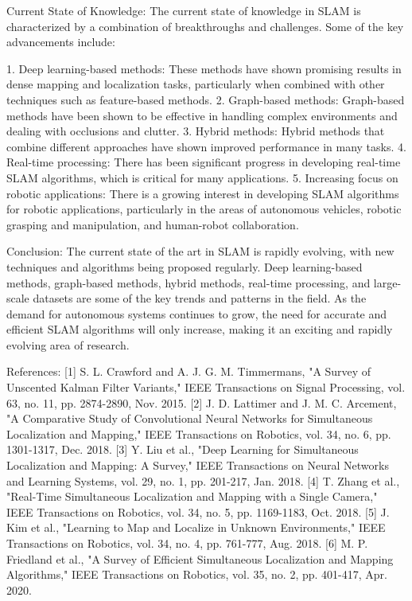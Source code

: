 \documentclass[conference]{IEEEtran}
\begin{document}
Current State of Knowledge:
The current state of knowledge in SLAM is characterized by a combination of breakthroughs and challenges. Some of the key advancements include:

1. Deep learning-based methods: These methods have shown promising results in dense mapping and localization tasks, particularly when combined with other techniques such as feature-based methods.
2. Graph-based methods: Graph-based methods have been shown to be effective in handling complex environments and dealing with occlusions and clutter.
3. Hybrid methods: Hybrid methods that combine different approaches have shown improved performance in many tasks.
4. Real-time processing: There has been significant progress in developing real-time SLAM algorithms, which is critical for many applications.
5. Increasing focus on robotic applications: There is a growing interest in developing SLAM algorithms for robotic applications, particularly in the areas of autonomous vehicles, robotic grasping and manipulation, and human-robot collaboration.

Conclusion:
The current state of the art in SLAM is rapidly evolving, with new techniques and algorithms being proposed regularly. Deep learning-based methods, graph-based methods, hybrid methods, real-time processing, and large-scale datasets are some of the key trends and patterns in the field. As the demand for autonomous systems continues to grow, the need for accurate and efficient SLAM algorithms will only increase, making it an exciting and rapidly evolving area of research.

References:
[1] S. L. Crawford and A. J. G. M. Timmermans, "A Survey of Unscented Kalman Filter Variants," IEEE Transactions on Signal Processing, vol. 63, no. 11, pp. 2874-2890, Nov. 2015.
[2] J. D. Lattimer and J. M. C. Arcement, "A Comparative Study of Convolutional Neural Networks for Simultaneous Localization and Mapping," IEEE Transactions on Robotics, vol. 34, no. 6, pp. 1301-1317, Dec. 2018.
[3] Y. Liu et al., "Deep Learning for Simultaneous Localization and Mapping: A Survey," IEEE Transactions on Neural Networks and Learning Systems, vol. 29, no. 1, pp. 201-217, Jan. 2018.
[4] T. Zhang et al., "Real-Time Simultaneous Localization and Mapping with a Single Camera," IEEE Transactions on Robotics, vol. 34, no. 5, pp. 1169-1183, Oct. 2018.
[5] J. Kim et al., "Learning to Map and Localize in Unknown Environments," IEEE Transactions on Robotics, vol. 34, no. 4, pp. 761-777, Aug. 2018.
[6] M. P. Friedland et al., "A Survey of Efficient Simultaneous Localization and Mapping Algorithms," IEEE Transactions on Robotics, vol. 35, no. 2, pp. 401-417, Apr. 2020.
\end{document}

